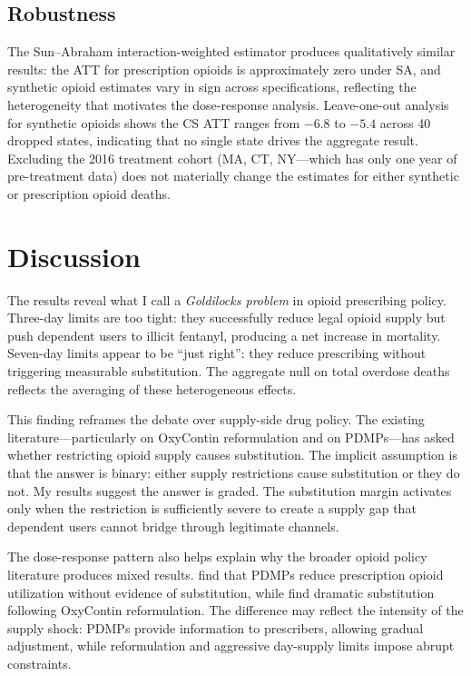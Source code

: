 \documentclass[12pt]{article}
\begin{document}
\subsection{Robustness}

The Sun--Abraham interaction-weighted estimator produces qualitatively similar results: the ATT for prescription opioids is approximately zero under SA, and synthetic opioid estimates vary in sign across specifications, reflecting the heterogeneity that motivates the dose-response analysis. Leave-one-out analysis for synthetic opioids shows the CS ATT ranges from $-6.8$ to $-5.4$ across 40 dropped states, indicating that no single state drives the aggregate result. Excluding the 2016 treatment cohort (MA, CT, NY---which has only one year of pre-treatment data) does not materially change the estimates for either synthetic or prescription opioid deaths.


\section{Discussion}

The results reveal what I call a \textit{Goldilocks problem} in opioid prescribing policy. Three-day limits are too tight: they successfully reduce legal opioid supply but push dependent users to illicit fentanyl, producing a net increase in mortality. Seven-day limits appear to be ``just right'': they reduce prescribing without triggering measurable substitution. The aggregate null on total overdose deaths reflects the averaging of these heterogeneous effects.

This finding reframes the debate over supply-side drug policy. The existing literature---particularly \citet{alpert2018supply} on OxyContin reformulation and \citet{mallatt2020policy} on PDMPs---has asked whether restricting opioid supply causes substitution. The implicit assumption is that the answer is binary: either supply restrictions cause substitution or they do not. My results suggest the answer is graded. The substitution margin activates only when the restriction is sufficiently severe to create a supply gap that dependent users cannot bridge through legitimate channels.

The dose-response pattern also helps explain why the broader opioid policy literature produces mixed results. \citet{buchmueller2020effect} find that PDMPs reduce prescription opioid utilization without evidence of substitution, while \citet{alpert2018supply} find dramatic substitution following OxyContin reformulation. The difference may reflect the intensity of the supply shock: PDMPs provide information to prescribers, allowing gradual adjustment, while reformulation and aggressive day-supply limits impose abrupt constraints.
\end{document}
